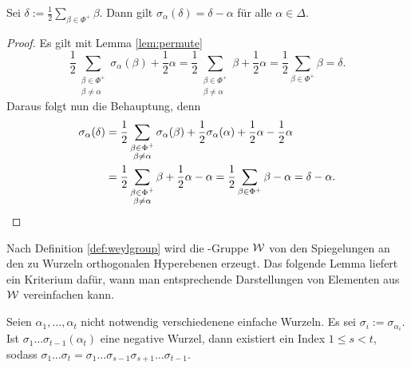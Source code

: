 \begin{cor}
  \label{cor:sigmaDelta}
  Sei $\delta := \tfrac{1}{2} \sum_{\beta \in \Phi^+} \beta$.
  Dann gilt $\sigma_\alpha(\delta) = \delta - \alpha$ für alle $\alpha \in \Delta$.
\end{cor}

\begin{proof}
  Es gilt mit Lemma \ref{lem:permute}
  \begin{displaymath}
    \frac{1}{2} \sum_{\substack{\beta \in \Phi^+\\ \beta \neq \alpha}} \sigma_\alpha(\beta) + \frac{1}{2}\alpha 
  = \frac{1}{2} \sum_{\substack{\beta \in \Phi^+\\ \beta \neq \alpha}} \beta + \frac{1}{2}\alpha
  = \frac{1}{2} \sum_{\beta \in \Phi^+} \beta
  = \delta.
  \end{displaymath}
  Daraus folgt nun die Behauptung, denn
  \begin{align*}
    \sigma_\alpha(\delta) 
    &= \frac{1}{2} \sum_{\substack{\beta \in \Phi^+\\ \beta \neq \alpha}} \sigma_\alpha(\beta) + \frac{1}{2} \sigma_\alpha(\alpha) + \frac{1}{2} \alpha - \frac{1}{2} \alpha \\
    &= \frac{1}{2} \sum_{\substack{\beta \in \Phi^+\\ \beta \neq \alpha}} \beta + \frac{1}{2} \alpha - \alpha 
    = \frac{1}{2} \sum_{\beta \in \Phi^+} \beta - \alpha 
    = \delta - \alpha. \qedhere
  \end{align*}
\end{proof}

Nach Definition \ref{def:weylgroup} wird die \weyl\hyp{}Gruppe $\mathcal{W}$ von den Spiegelungen an den zu Wurzeln orthogonalen Hyperebenen erzeugt.
Das folgende Lemma liefert ein Kriterium dafür, wann man entsprechende Darstellungen von Elementen aus $\mathcal{W}$ vereinfachen kann.

\begin{lem}
  \label{lem:simplify}
  Seien $\alpha_1,\dots,\alpha_t$ nicht notwendig verschiedenene einfache Wurzeln. Es sei $\sigma_i := \sigma_{\alpha_i}$.
  Ist $\sigma_1 \dots \sigma_{t-1}(\alpha_t)$ eine negative Wurzel, dann existiert ein Index $1 \leq s < t$, sodass $\sigma_1 \dots \sigma_t = \sigma_1 \dots \sigma_{s-1} \sigma_{s+1} \dots \sigma_{t-1}$.
\end{lem}

